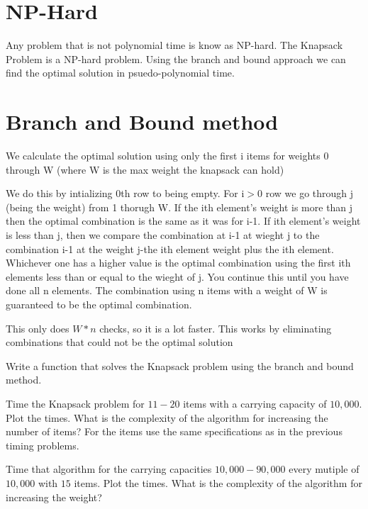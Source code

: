 \section*{NP-Hard}

Any problem that is not polynomial time is know as NP-hard. The Knapsack Problem is a NP-hard problem. Using the branch and bound approach we can find the optimal solution in psuedo-polynomial time.

\section*{Branch and Bound method}
We calculate the optimal solution using only the first i items for weights 0 through W (where W is the max weight the knapsack can hold)

We do this by intializing 0th row to being empty.
For i$>$0 row we go through j (being the weight) from 1 thorugh W. If the ith element's weight is more than j then the optimal combination is the same as it was for i-1. If ith element's weight is less than j, then we compare the combination at i-1 at wieght j to the combination i-1 at the weight j-the ith element weight plus the ith element. Whichever one has a higher value is the optimal combination using the first ith elements less than or equal to the wieght of j. You continue this until you have done all n elements. The combination using n items with a weight of W is guaranteed to be the optimal combination.

This only does $W*n$ checks, so it is a lot faster. This works by eliminating combinations that could not be the optimal solution

\begin{problem}
Write a function that solves the Knapsack problem using the branch and bound method.
\end{problem}

\begin{problem}
Time the Knapsack problem for $11-20$ items with a carrying capacity of $10,000$. Plot the times. What is the complexity of the algorithm for increasing the number of items? For the items use the same specifications as in the previous timing problems.
\end{problem}

\begin{problem}
Time that algorithm for the carrying capacities $10,000-90,000$ every mutiple of $10,000$ with $15$ items. Plot the times. What is the complexity of the algorithm for increasing the weight?
\end{problem}
